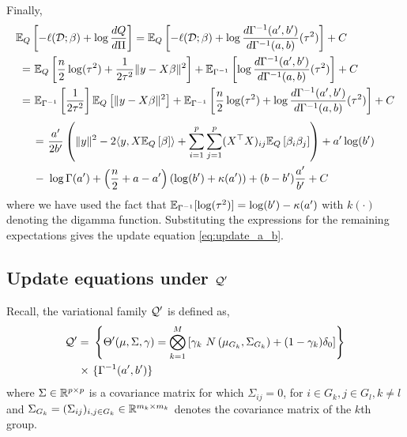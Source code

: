 Finally,
\begin{align}
    \mathbb{E}_{Q} & \left[ -\ell(\mathcal{D}; \beta) + \log \frac{dQ}{d\Pi} \right]
=  
    \mathbb{E}_{Q} \left[
-
    \ell(\mathcal{D}; \beta)
+   
    \log \frac{d\Gamma^{-1}(a', b')}{d \Gamma^{-1}(a, b)}(\tau^2)\right] 
+
    C \nonumber \\
= &\
\mathbb{E}_{Q} \left[ 
    \frac{n}{2}\log(\tau^2) 
+ 
    \frac{1}{2\tau^2} \| y - X \beta \|^2 
\right]
+
\mathbb{E}_{\Gamma^{-1}} \left[
    \log \frac{d\Gamma^{-1}(a', b')}{d \Gamma^{-1}(a, b)}(\tau^2)
\right] + C \nonumber \\
= &\
\mathbb{E}_{\Gamma^{-1}} \left[
    \frac{1}{2\tau^2}
\right]
\mathbb{E}_{Q} \left[ 
 \| y - X \beta \|^2 
\right]
+
\mathbb{E}_{\Gamma^{-1}} \left[
    \frac{n}{2}\log(\tau^2) 
+ 
    \log \frac{d\Gamma^{-1}(a', b')}{d \Gamma^{-1}(a, b)}(\tau^2)
\right] + C \nonumber
\end{align}
\begin{equation}
\begin{aligned}
= & \
\frac{a'}{2 b'} \left( \| y \|^2 
    - 2 \langle y, X \mathbb{E}_Q \left[ \beta \right] \rangle
+  \sum_{i=1}^p \sum_{j=1}^p (X^\top X)_{ij} \mathbb{E}_Q \left[ \beta_i \beta_j \right]
\right)
+ a' \log (b')  \\
- &\
\log \Gamma(a') + \left( \frac{n}{2} + a-a' \right)(\log(b') + \kappa(a')) + (b - b')\frac{a'}{b'} + C
\end{aligned}
\end{equation}
where we have used the fact that $\mathbb{E}_{\Gamma^{-1}}[\log(\tau^2)] = \log(b') - \kappa(a')$  with $k(\cdot)$ denoting the digamma function. Substituting the expressions for the remaining expectations gives the update equation \eqref{eq:update_a_b}.

\subsection{Update equations under $\mathcal{Q}'$}

Recall, the variational family $\mathcal{Q}'$ is defined as,
\begin{equation}
\begin{aligned}
    \mathcal{Q}' = &\
    \left\{ \Theta'(\mu, \Sigma, \gamma) = 
	\bigotimes_{k=1}^M 
	\left[ 
	    \gamma_k\ N\left(\mu_{G_k}, \Sigma_{G_k} \right) + 
	    (1-\gamma_k) \delta_0
	\right] 
    \right\} \\
    \times &\
    \{ \Gamma^{-1}(a', b') \}
\end{aligned}
\end{equation}
where $\Sigma \in \mathbb{R}^{p \times p}$ is a covariance matrix for which $\Sigma_{ij} = 0$, for $i \in G_k, j \in G_l, k \neq l$ and $\Sigma_{G_k} = (\Sigma_{ij})_{i, j \in G_k} \in \mathbb{R}^{m_k \times m_k}$ denotes the covariance matrix of the $k$th group.


